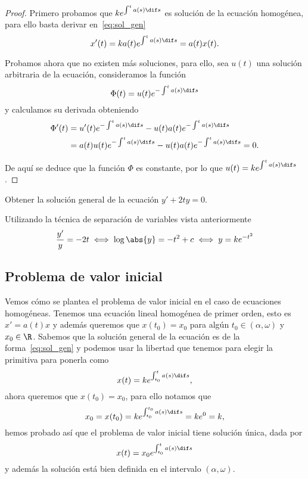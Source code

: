 \documentclass[../ecuaciones_diferenciales.tex]{subfiles}
\begin{document}
\begin{proof}
	Primero probamos que \(k e^{\int^t a(s) \dif s}\) es
	solución de la ecuación homogénea, para ello basta derivar
	en~\eqref{eq:sol_gen}
	\[x'(t) = k a(t) e^{\int^t a(s) \dif s} = a(t) x(t).\]

	Probamos ahora que no existen más soluciones, para ello, sea \(u(t)\) una
	solución arbitraria de la ecuación, consideramos la función
	\[\Phi(t) = u(t) e^{-\int^t a(s) \dif s}\]
	y calculamos su derivada obteniendo
	\begin{align*}
		\Phi'(t) & = u'(t) e^{-\int^t a(s) \dif s}
		- u(t) a(t) e^{-\int^t a(s) \dif s}            \\
		         & = a(t) u(t) e^{-\int^t a(s) \dif s}
		- u(t) a(t) e^{-\int^t a(s) \dif s} = 0.
	\end{align*}

	De aquí se deduce que la función \(\Phi\) es constante, por lo que
	\(u(t) = k e^{\int^t a(s) \dif s}\).
\end{proof}

\begin{example}
	Obtener la solución general de la ecuación \(y' + 2ty = 0\).
\end{example}

\begin{solution}
	Utilizando la técnica de separación de variables vista anteriormente
	\[\frac{y'}{y} = -2t \iff \log\abs{y} = -t^2 + c \iff y = k e^{-t^2}\]
\end{solution}

\subsection{Problema de valor inicial} \label{sec:pvi}

Vemos cómo se plantea el problema de valor inicial en el caso de ecuaciones
homogéneas. Tenemos una ecuación lineal homogénea de primer orden, esto es
\(x' = a(t)x\) y además queremos que \(x(t_0) = x_0\) para algún
\(t_0 \in (\alpha, \omega)\) y \(x_0 \in \R\).
Sabemos que la solución general de la ecuación es de la forma~\eqref{eq:sol_gen}
y podemos usar la libertad que tenemos para elegir la primitiva para ponerla como
\[x(t) = k e^{\int_{t_0}^t a(s) \dif s},\]
ahora queremos que \(x(t_0) = x_0\), para ello notamos que
\[x_0 = x(t_0) = k e^{\int_{t_0}^{t_0} a(s) \dif s} = ke^0 = k,\]
hemos probado así que el problema de valor inicial tiene solución única,
dada por
\begin{equation}
	x(t) = x_0 e^{\int_{t_0}^t a(s) \dif s} \label{eq:sol_pvi}
\end{equation}
y además la solución está bien definida en el intervalo \((\alpha, \omega)\).
\end{document}
